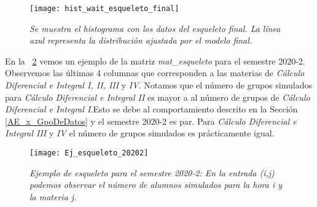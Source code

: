 \begin{figure}[H]
\centering
\texttt{[image: hist\_wait\_esqueleto\_final]} %
\caption[\textit{Histograma con los datos del esqueleto final}]{\textit{Se muestra el histograma con los datos del esqueleto final. La línea azul representa la distribución ajustada por el modelo final.}}\label{hist_wait_esq_fin}
\end{figure}


En la \figurename{~\ref{esqueleto20202}} vemos un ejemplo de la matriz \textit{mat\_esqueleto} para el semestre 2020-2. Observemos las últimas 4 columnas que corresponden a las materias de \textit{Cálculo Diferencial e Integral I, II, III} y \textit{IV}. Notamos que el número de grupos simulados para \textit{Cálculo Diferencial e Integral II} es mayor a al número de grupos de \textit{Cálculo Diferencial e Integral I}.Esto se debe al comportamiento descrito en la Sección \ref{AE_x_GpoDeDatos} y el semestre 2020-2 es par. Para \textit{Cálculo Diferencial e Integral III} y \textit{IV} el número de grupos simulados es prácticamente igual.

\begin{figure}[H]
\centering
\texttt{[image: Ej\_esqueleto\_20202]} %
\caption[\textit{Ejemplo de esqueleto para el semestre 2020-2}]{\textit{Ejemplo de esqueleto para el semestre 2020-2: En la entrada (i,j) podemos observar el número de alumnos simulados para la hora i y la materia j.}}\label{esqueleto20202}
\end{figure}


